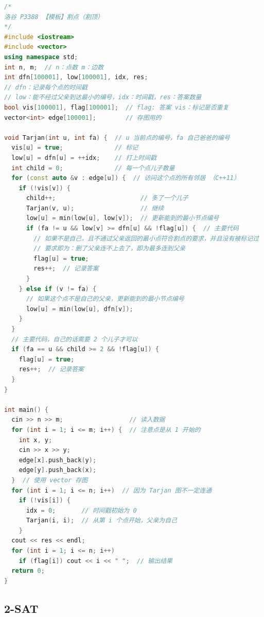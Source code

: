 \documentclass[a4paper,9pt]{extarticle}
\begin{document}
\begin{lstlisting}[language={C++}]
/*
洛谷 P3388 【模板】割点（割顶）
*/
#include <iostream>
#include <vector>
using namespace std;
int n, m;  // n：点数 m：边数
int dfn[100001], low[100001], idx, res;
// dfn：记录每个点的时间戳
// low：能不经过父亲到达最小的编号，idx：时间戳，res：答案数量
bool vis[100001], flag[100001];  // flag: 答案 vis：标记是否重复
vector<int> edge[100001];        // 存图用的

void Tarjan(int u, int fa) {  // u 当前点的编号，fa 自己爸爸的编号
  vis[u] = true;              // 标记
  low[u] = dfn[u] = ++idx;    // 打上时间戳
  int child = 0;              // 每一个点儿子数量
  for (const auto &v : edge[u]) {  // 访问这个点的所有邻居 （C++11）
    if (!vis[v]) {
      child++;                       // 多了一个儿子
      Tarjan(v, u);                  // 继续
      low[u] = min(low[u], low[v]);  // 更新能到的最小节点编号
      if (fa != u && low[v] >= dfn[u] && !flag[u]) {  // 主要代码
        // 如果不是自己，且不通过父亲返回的最小点符合割点的要求，并且没有被标记过
        // 要求即为：删了父亲连不上去了，即为最多连到父亲
        flag[u] = true;
        res++;  // 记录答案
      }
    } else if (v != fa) {
      // 如果这个点不是自己的父亲，更新能到的最小节点编号
      low[u] = min(low[u], dfn[v]);
    }
  }
  // 主要代码，自己的话需要 2 个儿子才可以
  if (fa == u && child >= 2 && !flag[u]) {
    flag[u] = true;
    res++;  // 记录答案
  }
}

int main() {
  cin >> n >> m;                  // 读入数据
  for (int i = 1; i <= m; i++) {  // 注意点是从 1 开始的
    int x, y;
    cin >> x >> y;
    edge[x].push_back(y);
    edge[y].push_back(x);
  }  // 使用 vector 存图
  for (int i = 1; i <= n; i++)  // 因为 Tarjan 图不一定连通
    if (!vis[i]) {
      idx = 0;       // 时间戳初始为 0
      Tarjan(i, i);  // 从第 i 个点开始，父亲为自己
    }
  cout << res << endl;
  for (int i = 1; i <= n; i++)
    if (flag[i]) cout << i << " ";  // 输出结果
  return 0;
}
\end{lstlisting}
\subsection{2-SAT}
\end{document}
